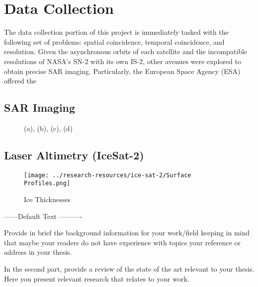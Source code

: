 \chapter{Data Collection}
\label{sec:Data_Collection}

The data collection portion of this project is immediately tasked with the following set of problems: spatial coincidence, temporal coincidence, and resolution. Given the asynchronous orbits of each satellite and the incompatible resolutions of NASA's SN-2 with its own IS-2, other avenues were explored to obtain precise SAR imaging. Particularly, the European Space Agency (ESA) offered the 

\section {SAR Imaging}


\begin{figure}
    \centering
    \caption{(a), (b), (c), (d)}
    \label{gathered-sar}%
\end{figure}

\section {Laser Altimetry (IceSat-2)}



\begin{figure}[]
	\centering
	\texttt{[image: ../research-resources/ice-sat-2/Surface Profiles.png]}
	\caption{Ice Thicknesses}
	\label{fig:ice-thickness-gathered}
\end{figure}

------Default Text ----------

Provide in brief the background information for your work/field keeping in mind that maybe your readers do not have experience with topics your reference or address in your thesis. 

In the second part, provide a review of the state of the art relevant to your thesis. Here you present relevant research that relates to your work. 
